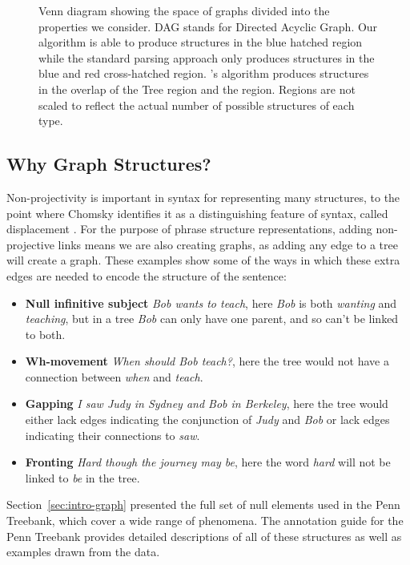 \begin{figure}
\centering
\scalebox{0.7}{

}
\caption[Venn diagram of graph space by properties]{\label{fig:venn} Venn diagram showing the space of graphs divided into the properties we consider.
DAG stands for Directed Acyclic Graph.
Our algorithm is able to produce structures in the blue hatched region while the standard parsing approach only produces structures in the blue and red cross-hatched region.
\textcite{ec}'s algorithm produces structures in the overlap of the Tree region and the \oneEC region.
Regions are not scaled to reflect the actual number of possible structures of each type.
}
\end{figure}

\subsection{Why Graph Structures?}

Non-projectivity is important in syntax for representing many structures, to the point where Chomsky identifies it as a distinguishing feature of syntax, called displacement \parencite{displacement}.
For the purpose of phrase structure representations, adding non-projective links means we are also creating graphs, as adding any edge to a tree will create a graph.
These examples show some of the ways in which these extra edges are needed to encode the structure of the sentence:

\begin{itemize}
  \item \textbf{Null infinitive subject} \emph{Bob wants to teach}, here \emph{Bob} is both \emph{wanting} and \emph{teaching}, but in a tree \emph{Bob} can only have one parent, and so can't be linked to both.
  \item \textbf{Wh-movement} \emph{When should Bob teach?}, here the tree would not have a connection between \emph{when} and \emph{teach}.
  \item \textbf{Gapping} \emph{I saw Judy in Sydney and Bob in Berkeley}, here the tree would either lack edges indicating the conjunction of \emph{Judy} and \emph{Bob} or lack edges indicating their connections to \emph{saw}.
  \item \textbf{Fronting} \emph{Hard though the journey may be}, here the word \emph{hard} will not be linked to \emph{be} in the tree.
\end{itemize}

Section~\ref{sec:intro-graph} presented the full set of null elements used in the Penn Treebank, which cover a wide range of phenomena.
The annotation guide for the Penn Treebank \parencite{ptb-guide} provides detailed descriptions of all of these structures as well as examples drawn from the data.

